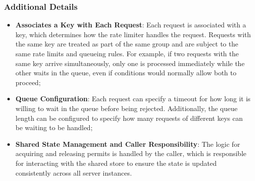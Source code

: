 \subsubsection{Additional Details}\label{subsubsec:rate-limiter-details}

\begin{itemize}
    \item \textbf{Associates a Key with Each Request}: Each request is associated with a key, which determines how the rate limiter handles the request.
    Requests with the same key are treated as part of the same group and are subject to the same rate limits and queueing rules.
    For example, if two requests with the same key arrive simultaneously, only one is processed immediately while the other waits in the queue, even if conditions would normally allow both to proceed;
    \item \textbf{Queue Configuration}: Each request can specify a timeout for how long it is willing to wait in the queue before being rejected.
    Additionally, the queue length can be configured to specify how many requests of different keys can be waiting to be handled;
    \item \textbf{Shared State Management and Caller Responsibility}: The logic for acquiring and releasing permits is handled by the caller, which is responsible for interacting with the shared store to ensure the state is updated consistently across all server instances.
\end{itemize}
